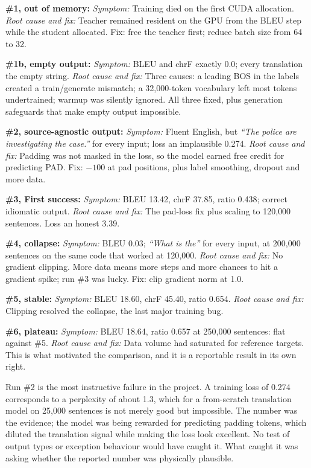 \begin{bullets}
\item \textbf{\#1, out of memory:} \emph{Symptom:} Training died on the first CUDA allocation. \emph{Root cause and fix:} Teacher remained resident on the GPU from the BLEU step while the student allocated. Fix: free the teacher first; reduce batch size from 64 to 32.
\item \textbf{\#1b, empty output:} \emph{Symptom:} BLEU and chrF exactly 0.0; every translation the empty string. \emph{Root cause and fix:} Three causes: a leading BOS in the labels created a train/generate mismatch; a 32{,}000-token vocabulary left most tokens undertrained; warmup was silently ignored. All three fixed, plus generation safeguards that make empty output impossible.
\item \textbf{\#2, source-agnostic output:} \emph{Symptom:} Fluent English, but \textit{``The police are investigating the case.''} for every input; loss an implausible 0.274. \emph{Root cause and fix:} Padding was not masked in the loss, so the model earned free credit for predicting PAD. Fix: $-100$ at pad positions, plus label smoothing, dropout and more data.
\item \textbf{\#3, \textbf{First success}:} \emph{Symptom:} BLEU 13.42, chrF 37.85, ratio 0.438; correct idiomatic output. \emph{Root cause and fix:} The pad-loss fix plus scaling to 120{,}000 sentences. Loss an honest 3.39.
\item \textbf{\#4, collapse:} \emph{Symptom:} BLEU 0.03; \textit{``What is the''} for every input, at 200{,}000 sentences on the same code that worked at 120{,}000. \emph{Root cause and fix:} No gradient clipping. More data means more steps and more chances to hit a gradient spike; run \#3 was lucky. Fix: clip gradient norm at 1.0.
\item \textbf{\#5, stable:} \emph{Symptom:} BLEU 18.60, chrF 45.40, ratio 0.654. \emph{Root cause and fix:} Clipping resolved the collapse, the last major training bug.
\item \textbf{\#6, plateau:} \emph{Symptom:} BLEU 18.64, ratio 0.657 at 250{,}000 sentences: flat against \#5. \emph{Root cause and fix:} Data volume had saturated for reference targets. This is what motivated the \seqkd{} comparison, and it is a reportable result in its own right.
\end{bullets}

Run \#2 is the most instructive failure in the project. A training loss of 0.274
corresponds to a perplexity of about 1.3, which for a from-scratch translation
model on 25{,}000 sentences is not merely good but impossible. The number was
the evidence; the model was being rewarded for predicting padding tokens, which
diluted the translation signal while making the loss look excellent. No test of
output types or exception behaviour would have caught it. What caught it was
asking whether the reported number was physically plausible.

